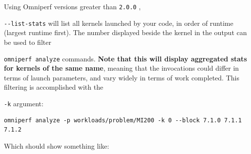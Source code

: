 \documentclass[
]{article}
\let\oldtexttt\texttt
\renewcommand{\texttt}[1]{
  \colorbox{Light}{\oldtexttt{#1}}
}
\begin{document}
Using Omniperf versions greater than \texttt{2.0.0},
\texttt{-\/-list-stats} will list all kernels launched by your code, in
order of runtime (largest runtime first). The number displayed beside
the kernel in the output can be used to filter
\texttt{omniperf\ analyze} commands. \textbf{Note that this will display
aggregated stats for kernels of the same name}, meaning that the
invocations could differ in terms of launch parameters, and vary widely
in terms of work completed. This filtering is accomplished with the
\texttt{-k} argument:

\begin{Verbatim}
omniperf analyze -p workloads/problem/MI200 -k 0 --block 7.1.0 7.1.1 7.1.2
\end{Verbatim}

Which should show something like:
\end{document}
